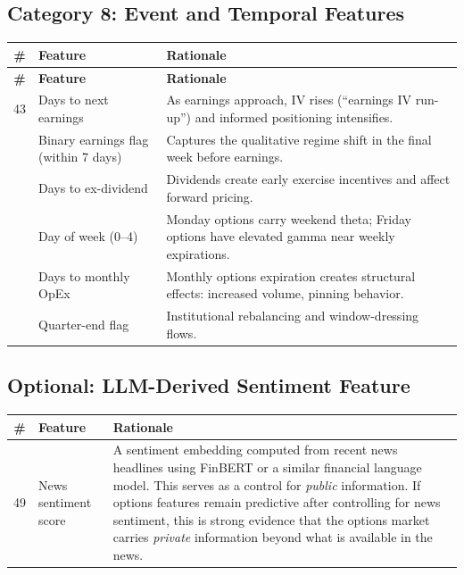 \documentclass[11pt,a4paper]{article}
\begin{document}
\subsection{Category 8: Event and Temporal Features}

\begin{longtable}{@{}cp{3cm}p{8cm}@{}}
\toprule
\textbf{\#} & \textbf{Feature} & \textbf{Rationale} \\
\midrule
\endfirsthead
\toprule
\textbf{\#} & \textbf{Feature} & \textbf{Rationale} \\
\midrule
\endhead
43 & Days to next earnings & As earnings approach, IV rises (``earnings IV run-up'') and informed positioning intensifies. \\
\addlinespace
44 & Binary earnings flag (within 7 days) & Captures the qualitative regime shift in the final week before earnings. \\
\addlinespace
45 & Days to ex-dividend & Dividends create early exercise incentives and affect forward pricing. \\
\addlinespace
46 & Day of week (0--4) & Monday options carry weekend theta; Friday options have elevated gamma near weekly expirations. \\
\addlinespace
47 & Days to monthly OpEx & Monthly options expiration creates structural effects: increased volume, pinning behavior. \\
\addlinespace
48 & Quarter-end flag & Institutional rebalancing and window-dressing flows. \\
\bottomrule
\end{longtable}

\subsection{Optional: LLM-Derived Sentiment Feature}

\begin{longtable}{@{}cp{3cm}p{8cm}@{}}
\toprule
\textbf{\#} & \textbf{Feature} & \textbf{Rationale} \\
\midrule
49 & News sentiment score & A sentiment embedding computed from recent news headlines using FinBERT or a similar financial language model. This serves as a control for \emph{public} information. If options features remain predictive after controlling for news sentiment, this is strong evidence that the options market carries \emph{private} information beyond what is available in the news. \\
\bottomrule
\end{longtable}
\end{document}
